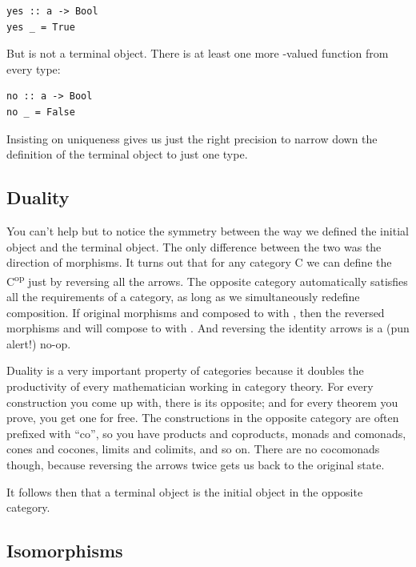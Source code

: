 \begin{verbatim}
yes :: a -> Bool
yes _ = True
\end{verbatim}

But  is not a terminal object. There is at least one more
-valued function from every type:

\begin{verbatim}
no :: a -> Bool
no _ = False
\end{verbatim}

Insisting on uniqueness gives us just the right precision to narrow down
the definition of the terminal object to just one type.

\subsection{Duality}\label{duality}

You can't help but to notice the symmetry between the way we defined the
initial object and the terminal object. The only difference between the
two was the direction of morphisms. It turns out that for any category C
we can define the  C\textsuperscript{op} just by
reversing all the arrows. The opposite category automatically satisfies
all the requirements of a category, as long as we simultaneously
redefine composition. If original morphisms
 and  composed
to  with , then the reversed
morphisms  and
 will compose to
 with . And reversing
the identity arrows is a (pun alert!) no-op.

Duality is a very important property of categories because it doubles
the productivity of every mathematician working in category theory. For
every construction you come up with, there is its opposite; and for
every theorem you prove, you get one for free. The constructions in the
opposite category are often prefixed with ``co'', so you have products
and coproducts, monads and comonads, cones and cocones, limits and
colimits, and so on. There are no cocomonads though, because reversing
the arrows twice gets us back to the original state.

It follows then that a terminal object is the initial object in the
opposite category.

\subsection{Isomorphisms}\label{isomorphisms}


